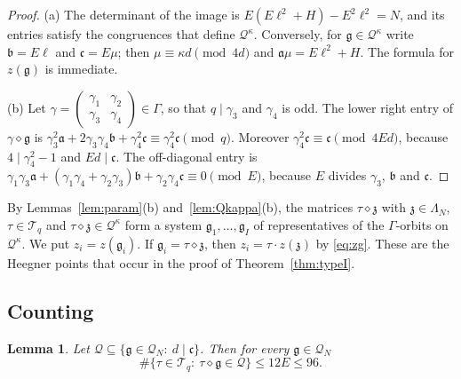 \documentclass[11pt]{amsart}
\newtheorem{lemma}[theorem]{Lemma}
\theoremstyle{remark}
\theoremstyle{definition}
\numberwithin{equation}{section}
\newcommand{\Qc}{\mathcal{Q}}
\newcommand{\Tc}{\mathcal{T}}
\newcommand{\ga}{\mathfrak{a}}
\newcommand{\gb}{\mathfrak{b}}
\newcommand{\gc}{\mathfrak{c}}
\newcommand{\fg}{\mathfrak{g}}
\newcommand{\gz}{\mathfrak{z}}
\begin{document}
\begin{proof}
(a) The determinant of the image is $E(E\ell^2+H)-E^2\ell^2=N$, and its entries satisfy the congruences that define $\Qc^\kappa$. Conversely, for $\fg\in\Qc^\kappa$ write $\gb=E\ell$ and $\gc=E\mu$; then $\mu\equiv\kappa d\pmod{4d}$ and $\ga\mu=E\ell^2+H$. The formula for $z(\fg)$ is immediate.

(b) Let $\gamma=\left(\begin{smallmatrix}\gamma_1&\gamma_2\\ \gamma_3&\gamma_4\end{smallmatrix}\right)\in\Gamma$, so that $q\mid\gamma_3$ and $\gamma_4$ is odd. The lower right entry of $\gamma\diamond\fg$ is $\gamma_3^2\ga+2\gamma_3\gamma_4\gb+\gamma_4^2\gc\equiv\gamma_4^2\gc\pmod q$. Moreover $\gamma_4^2\gc\equiv\gc\pmod{4Ed}$, because $4\mid\gamma_4^2-1$ and $Ed\mid\gc$. The off-diagonal entry is $\gamma_1\gamma_3\ga+(\gamma_1\gamma_4+\gamma_2\gamma_3)\gb+\gamma_2\gamma_4\gc\equiv0\pmod E$, because $E$ divides $\gamma_3$, $\gb$ and $\gc$.
\end{proof}

By Lemmas~\ref{lem:param}(b) and~\ref{lem:Qkappa}(b), the matrices $\tau\diamond\gz$ with $\gz\in\Lambda_N$, $\tau\in\Tc_q$ and $\tau\diamond\gz\in\Qc^\kappa$ form a system $\fg_1,\dots,\fg_I$ of representatives of the $\Gamma$-orbits on $\Qc^\kappa$. We put $z_i=z(\fg_i)$. If $\fg_i=\tau\diamond\gz$, then $z_i=\tau\cdot z(\gz)$ by \eqref{eq:zg}. These are the Heegner points that occur in the proof of Theorem~\ref{thm:typeI}.

\subsection{Counting}

\begin{lemma}\label{lem:cosets}
Let $\Qc\subseteq\{\fg\in\Qc_N:\ d\mid\gc\}$. Then for every $\fg\in\Qc_N$
\begin{equation}\label{eq:ntau}
\#\{\tau\in\Tc_q:\ \tau\diamond\fg\in\Qc\}\le12E\le96 .
\end{equation}
\end{lemma}
\end{document}
